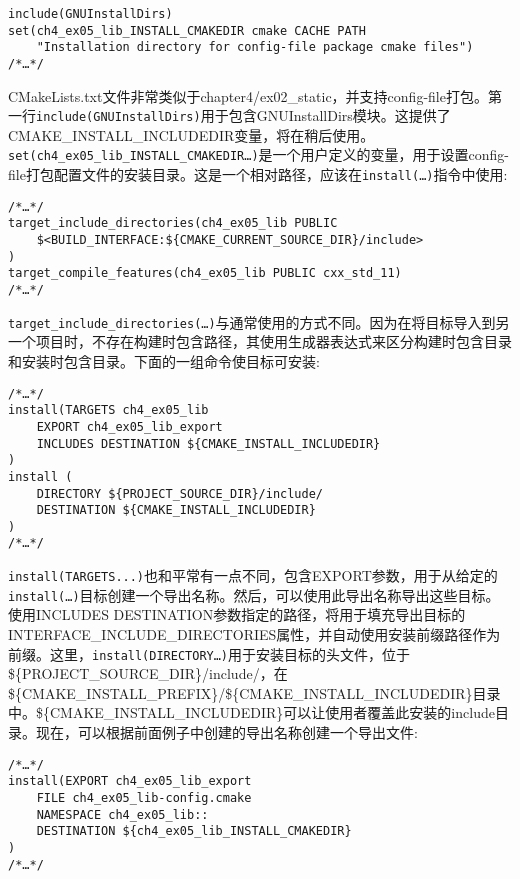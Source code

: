 \begin{lstlisting}[style=styleCMake]
include(GNUInstallDirs)
set(ch4_ex05_lib_INSTALL_CMAKEDIR cmake CACHE PATH
	"Installation directory for config-file package cmake files")
/*…*/
\end{lstlisting}

CMakeLists.txt文件非常类似于chapter4/ex02\_static，并支持config-file打包。第一行\texttt{include(GNUInstallDirs)}用于包含GNUInstallDirs模块。这提供了CMAKE\_INSTALL\_INCLUDEDIR变量，将在稍后使用。\texttt{set(ch4\_ex05\_lib\_INSTALL\_CMAKEDIR…)}是一个用户定义的变量，用于设置config-file打包配置文件的安装目录。这是一个相对路径，应该在\texttt{install(…)}指令中使用:

\begin{lstlisting}[style=styleCMake]
/*…*/
target_include_directories(ch4_ex05_lib PUBLIC
	$<BUILD_INTERFACE:${CMAKE_CURRENT_SOURCE_DIR}/include>
)
target_compile_features(ch4_ex05_lib PUBLIC cxx_std_11)
/*…*/
\end{lstlisting}

\texttt{target\_include\_directories(…)}与通常使用的方式不同。因为在将目标导入到另一个项目时，不存在构建时包含路径，其使用生成器表达式来区分构建时包含目录和安装时包含目录。下面的一组命令使目标可安装:

\begin{lstlisting}[style=styleCMake]
/*…*/
install(TARGETS ch4_ex05_lib
	EXPORT ch4_ex05_lib_export
	INCLUDES DESTINATION ${CMAKE_INSTALL_INCLUDEDIR}
)
install (
	DIRECTORY ${PROJECT_SOURCE_DIR}/include/
	DESTINATION ${CMAKE_INSTALL_INCLUDEDIR}
)
/*…*/
\end{lstlisting}

\texttt{install(TARGETS...)}也和平常有一点不同，包含EXPORT参数，用于从给定的\texttt{install(…)}目标创建一个导出名称。然后，可以使用此导出名称导出这些目标。使用INCLUDES DESTINATION参数指定的路径，将用于填充导出目标的INTERFACE\_INCLUDE\_DIRECTORIES属性，并自动使用安装前缀路径作为前缀。这里，\texttt{install(DIRECTORY…)}用于安装目标的头文件，位于\$\{PROJECT\_SOURCE\_DIR\}/include/，在\$\{CMAKE\_INSTALL\_PREFIX\}/\$\{CMAKE\_INSTALL\_INCLUDEDIR\}目录中。\$\{CMAKE\_INSTALL\_INCLUDEDIR\}可以让使用者覆盖此安装的include目录。现在，可以根据前面例子中创建的导出名称创建一个导出文件:

\begin{lstlisting}[style=styleCMake]
/*…*/
install(EXPORT ch4_ex05_lib_export
	FILE ch4_ex05_lib-config.cmake
	NAMESPACE ch4_ex05_lib::
	DESTINATION ${ch4_ex05_lib_INSTALL_CMAKEDIR}
)
/*…*/
\end{lstlisting}

